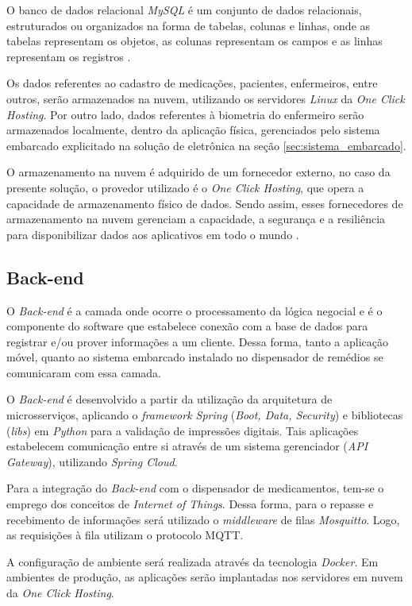 O banco de dados relacional \emph{MySQL} é um conjunto de dados relacionais, estruturados ou organizados na forma de tabelas, colunas e linhas, onde as tabelas representam os objetos, as colunas representam os campos e as linhas representam os registros \cite{EDUCBA_2020}.

Os dados referentes ao cadastro de medicações, pacientes, enfermeiros, entre outros, serão armazenados na nuvem, utilizando os servidores \textit{Linux} da \textit{One Click Hosting}. Por outro lado, dados referentes à biometria do enfermeiro serão armazenados localmente, dentro da aplicação física, gerenciados pelo sistema embarcado explicitado na solução de eletrônica na seção \ref{sec:sistema_embarcado}.

O armazenamento na nuvem é adquirido de um fornecedor externo, no caso da presente solução, o provedor utilizado é o \textit{One Click Hosting}, que opera a capacidade de armazenamento físico de dados. Sendo assim, esses fornecedores de armazenamento na nuvem gerenciam a capacidade, a segurança e a resiliência para disponibilizar dados aos aplicativos em todo o mundo \cite{AMAZONWEBSERVICES_2020}.

\subsection{Back-end}\label{sec:software_backend}
O \emph{Back-end} é a camada onde ocorre o processamento da lógica negocial e é o componente do software que estabelece conexão com a base de dados para registrar e/ou prover informações a um cliente. Dessa forma, tanto a aplicação móvel, quanto ao sistema embarcado instalado no dispensador de remédios se comunicaram com essa camada.

O \emph{Back-end} é desenvolvido a partir da utilização da arquitetura de microsserviços, aplicando o \emph{framework Spring} (\emph{Boot, Data, Security}) e bibliotecas (\emph{libs}) em \textit{Python} para a validação de impressões digitais. Tais aplicações estabelecem comunicação entre si através de um sistema gerenciador (\emph{API Gateway}), utilizando \textit{Spring Cloud}.

Para a integração do \textit{Back-end} com o dispensador de medicamentos, tem-se o emprego dos conceitos de \emph{Internet of Things}. Dessa forma, para o repasse e recebimento de informações será utilizado o \emph{middleware} de filas \textit{Mosquitto}. Logo, as requisições à fila utilizam o protocolo MQTT.

A configuração de ambiente será realizada através da tecnologia \textit{Docker}. Em ambientes de produção, as aplicações serão implantadas nos servidores em nuvem da \textit{One Click Hosting}.

